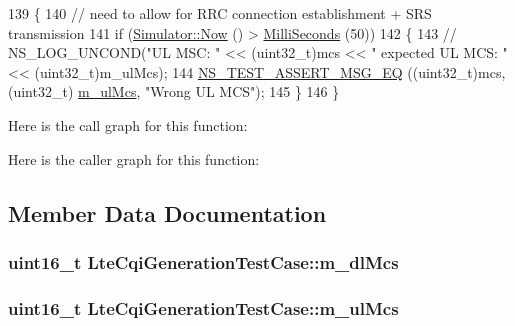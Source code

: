 \begin{DoxyCode}
139 \{
140   \textcolor{comment}{// need to allow for RRC connection establishment + SRS transmission}
141   \textcolor{keywordflow}{if} (\hyperlink{group__simulator_gac3635e2e87f7ce316c89290ee1b01d0d}{Simulator::Now} () > \hyperlink{group__timecivil_gaf26127cf4571146b83a92ee18679c7a9}{MilliSeconds} (50))
142     \{
143 \textcolor{comment}{//        NS\_LOG\_UNCOND("UL MSC: " << (uint32\_t)mcs << " expected UL MCS: " << (uint32\_t)m\_ulMcs);}
144       \hyperlink{group__testing_ga2a9d78cffb3db8e867c35fff0b698cf5}{NS\_TEST\_ASSERT\_MSG\_EQ} ((uint32\_t)mcs, (uint32\_t)
      \hyperlink{classLteCqiGenerationTestCase_aae5a91d853746890fc47b96f9798749a}{m\_ulMcs}, \textcolor{stringliteral}{"Wrong UL MCS"});
145     \}
146 \}
\end{DoxyCode}


Here is the call graph for this function\+:




Here is the caller graph for this function\+:




\subsection{Member Data Documentation}
\subsubsection[{\texorpdfstring{m\+\_\+dl\+Mcs}{m_dlMcs}}]{\setlength{\rightskip}{0pt plus 5cm}uint16\+\_\+t Lte\+Cqi\+Generation\+Test\+Case\+::m\+\_\+dl\+Mcs\hspace{0.3cm}{\ttfamily [private]}}\hypertarget{classLteCqiGenerationTestCase_ad2e57cab31a10da0721ceb7e28c032db}{}\label{classLteCqiGenerationTestCase_ad2e57cab31a10da0721ceb7e28c032db}
\subsubsection[{\texorpdfstring{m\+\_\+ul\+Mcs}{m_ulMcs}}]{\setlength{\rightskip}{0pt plus 5cm}uint16\+\_\+t Lte\+Cqi\+Generation\+Test\+Case\+::m\+\_\+ul\+Mcs\hspace{0.3cm}{\ttfamily [private]}}\hypertarget{classLteCqiGenerationTestCase_aae5a91d853746890fc47b96f9798749a}{}\label{classLteCqiGenerationTestCase_aae5a91d853746890fc47b96f9798749a}
